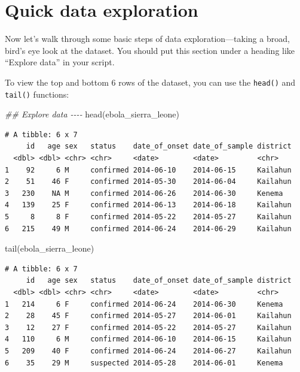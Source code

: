 \documentclass[
  letterpaper,
  DIV=11,
  numbers=noendperiod]{scrreprt}
\newenvironment{Shaded}{\begin{snugshade}}{\end{snugshade}}
\newcommand{\DocumentationTok}[1]{\textcolor[rgb]{0.37,0.37,0.37}{\textit{#1}}}
\newcommand{\FunctionTok}[1]{\textcolor[rgb]{0.28,0.35,0.67}{#1}}
\newcommand{\NormalTok}[1]{\textcolor[rgb]{0.00,0.23,0.31}{#1}}
\begin{document}
\section{Quick data exploration}\label{quick-data-exploration}

Now let's walk through some basic steps of data exploration---taking a
broad, bird's eye look at the dataset. You should put this section under
a heading like ``Explore data'' in your script.

To view the top and bottom 6 rows of the dataset, you can use the
\texttt{head()} and \texttt{tail()} functions:

\begin{Shaded}
\begin{Highlighting}[]
\DocumentationTok{\#\# Explore data {-}{-}{-}{-}}
\FunctionTok{head}\NormalTok{(ebola\_sierra\_leone)}
\end{Highlighting}
\end{Shaded}

\begin{verbatim}
# A tibble: 6 x 7
     id   age sex   status    date_of_onset date_of_sample district
  <dbl> <dbl> <chr> <chr>     <date>        <date>         <chr>   
1    92     6 M     confirmed 2014-06-10    2014-06-15     Kailahun
2    51    46 F     confirmed 2014-05-30    2014-06-04     Kailahun
3   230    NA M     confirmed 2014-06-26    2014-06-30     Kenema  
4   139    25 F     confirmed 2014-06-13    2014-06-18     Kailahun
5     8     8 F     confirmed 2014-05-22    2014-05-27     Kailahun
6   215    49 M     confirmed 2014-06-24    2014-06-29     Kailahun
\end{verbatim}

\begin{Shaded}
\begin{Highlighting}[]
\FunctionTok{tail}\NormalTok{(ebola\_sierra\_leone)}
\end{Highlighting}
\end{Shaded}

\begin{verbatim}
# A tibble: 6 x 7
     id   age sex   status    date_of_onset date_of_sample district
  <dbl> <dbl> <chr> <chr>     <date>        <date>         <chr>   
1   214     6 F     confirmed 2014-06-24    2014-06-30     Kenema  
2    28    45 F     confirmed 2014-05-27    2014-06-01     Kailahun
3    12    27 F     confirmed 2014-05-22    2014-05-27     Kailahun
4   110     6 M     confirmed 2014-06-10    2014-06-15     Kailahun
5   209    40 F     confirmed 2014-06-24    2014-06-27     Kailahun
6    35    29 M     suspected 2014-05-28    2014-06-01     Kenema  
\end{verbatim}
\end{document}

